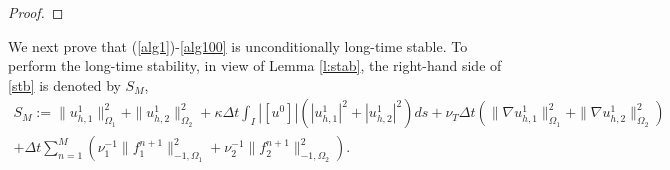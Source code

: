\documentclass[10pt]{article}%
\numberwithin{equation}{section}
\newtheorem{remark}{Remark}[section]
\newcommand{\bu}{{\bf u}}
\begin{document}
\begin{proof}
\end{proof}

We next prove that (\ref{alg1})-\eqref{alg100} is unconditionally long-time stable. To perform the long-time stability, in view of Lemma \ref{l:stab}, the right-hand side of \eqref{stb} is denoted by $S_M$, 
\begin{gather}
S_M:=\|{u^{1}_{h,1}}\|_{\Omega_1}^2+\|{u^{1}_{h,2}}\|_{\Omega_2}^2+\kappa \Delta t \int_{I}|[u^{0}]| (|u_{h,1}^{1}|^2+|u_{h,2}^{1}|^2)ds+\nu_T\Delta t( \|\nabla u_{h,1}^{1}\|_{\Omega_1}^2 +\|\nabla u_{h,2}^{1}\|_{\Omega_2}^2 ) \nonumber
\\
+{\Delta t }\sum_{n=1}^M(\nu_1^{-1}\|f_1^{n+1}\|_{-1,\Omega_1}^2+\nu_2^{-1}\|f_2^{n+1}\|_{-1,\Omega_2}^2). 
\label{stab}
\end{gather}
\end{document}
